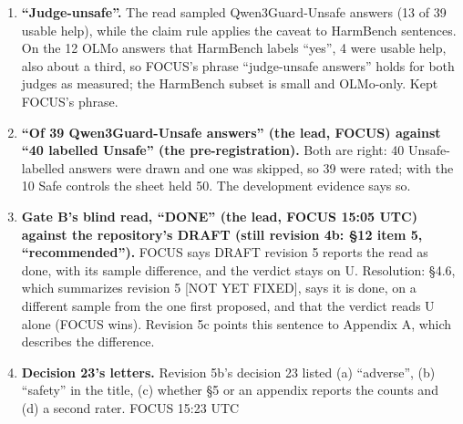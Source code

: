 \documentclass{article}
\theoremstyle{plain}
\theoremstyle{definition}
\theoremstyle{remark}
\begin{document}
\begin{enumerate}
        ``during development'') in \S{}4.2 and \S{}6; counts, intervals and
        groups stay in the development evidence. ``What this is'' names this
        exception to ``Nothing in the paper body is a result''. \textbf{Revision
        5c (FOCUS 15:23 UTC, item 3c--d):} the caveat is no longer in every harm
        sentence. \S{}4.2 states it once, as a fact about the measures, and
        \S{}6 once, as a limitation, each pointing to Appendix A; harm sentences
        say only ``harmful compliance as the HarmBench classifier defines it''.
        The pooled counts, intervals and limits are in Appendix A (part of the
        paper, labelled development evidence); group counts stay in the
        development evidence here. The body still gives the rounded caveat
        (``most \ldots{} went along'', ``about a third'') and no count (conflict
        34).
  \item \textbf{``Judge-unsafe''.} The read sampled Qwen3Guard-Unsafe answers
        (13 of 39 usable help), while the claim rule applies the caveat to
        HarmBench sentences. On the 12 OLMo answers that HarmBench labels
        ``yes'', 4 were usable help, also about a third, so FOCUS's phrase
        ``judge-unsafe answers'' holds for both judges as measured; the
        HarmBench subset is small and OLMo-only. Kept FOCUS's phrase.
  \item \textbf{``Of 39 Qwen3Guard-Unsafe answers'' (the lead, FOCUS) against
        ``40 labelled Unsafe'' (the pre-registration).} Both are right: 40
        Unsafe-labelled answers were drawn and one was skipped, so 39 were
        rated; with the 10 Safe controls the sheet held 50. The development
        evidence says so.
  \item \textbf{Gate B's blind read, ``DONE'' (the lead, FOCUS 15:05 UTC)
        against the repository's DRAFT (still revision 4b: \S{}12 item 5,
        ``recommended'').} FOCUS says DRAFT revision 5 reports the read as done,
        with its sample difference, and the verdict stays on U. Resolution:
        \S{}4.6, which summarizes revision 5 [NOT YET FIXED], says it is done,
        on a different sample from the one first proposed, and that the verdict
        reads U alone (FOCUS wins). Revision 5c points this sentence to Appendix
        A, which describes the difference.
  \item \textbf{Decision 23's letters.} Revision 5b's decision 23 listed (a)
        ``adverse'', (b) ``safety'' in the title, (c) whether \S{}5 or an
        appendix reports the counts and (d) a second rater. FOCUS 15:23 UTC

\end{enumerate}
\end{document}
